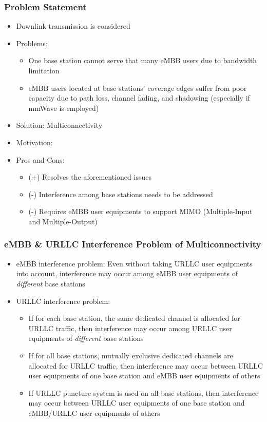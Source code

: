 \documentclass{beamer}
\begin{document}
\begin{frame}
  \frametitle{Problem Statement}
  \begin{itemize}
    \item Downlink transmission is considered
    \item Problems:
      \begin{itemize}
        \item One base station cannot serve that many eMBB users due to bandwidth limitation
        \item eMBB users located at base stations' coverage edges suffer from poor capacity due to path loss, channel fading, and shadowing (especially if mmWave is employed)
      \end{itemize}
    \item Solution: Multiconnectivity
    \item Motivation:
    \item Pros and Cons:
      \begin{itemize}
        \item (+) Resolves the aforementioned issues
        \item (-) Interference among base stations needs to be addressed
        \item (-) Requires eMBB user equipments to support MIMO (Multiple-Input and Multiple-Output)
      \end{itemize}
  \end{itemize}
\end{frame}

\begin{frame}
  \frametitle{eMBB \& URLLC Interference Problem of Multiconnectivity}
  \begin{itemize}
    \item eMBB interference problem: Even without taking URLLC user equipments into account, interference may occur among eMBB user equipments of \emph{different} base stations
    \item URLLC interference problem:
      \begin{itemize}
        \item If for each base station, the same dedicated channel is allocated for URLLC traffic, then interference may occur among URLLC user equipments of \emph{different} base stations
        \item If for all base stations, mutually exclusive dedicated channels are allocated for URLLC traffic, then interference may occur between URLLC user equipments of one base station and eMBB user equipments of others
        \item If URLLC puncture system is used on all base stations, then interference may occur between URLLC user equipments of one base station and eMBB/URLLC user equipments of others
      \end{itemize}
  \end{itemize}
\end{frame}
\end{document}
